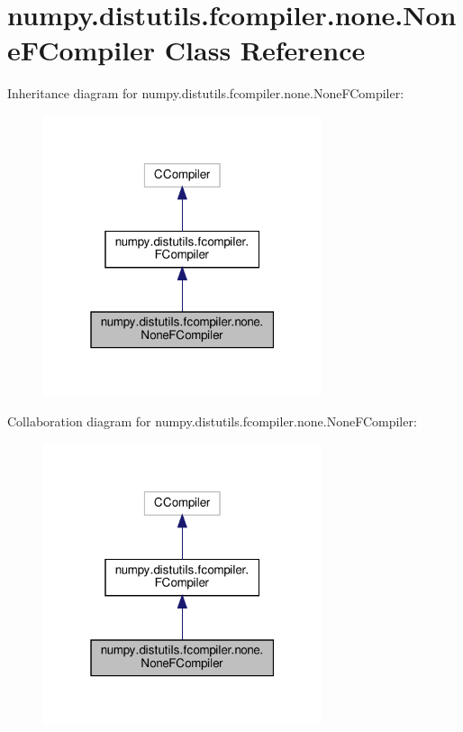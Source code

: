 \hypertarget{classnumpy_1_1distutils_1_1fcompiler_1_1none_1_1NoneFCompiler}{}\section{numpy.\+distutils.\+fcompiler.\+none.\+None\+F\+Compiler Class Reference}
\label{classnumpy_1_1distutils_1_1fcompiler_1_1none_1_1NoneFCompiler}


Inheritance diagram for numpy.\+distutils.\+fcompiler.\+none.\+None\+F\+Compiler\+:
\nopagebreak
\begin{figure}[H]
\begin{center}
\leavevmode
\includegraphics[width=232pt]{classnumpy_1_1distutils_1_1fcompiler_1_1none_1_1NoneFCompiler__inherit__graph}
\end{center}
\end{figure}


Collaboration diagram for numpy.\+distutils.\+fcompiler.\+none.\+None\+F\+Compiler\+:
\nopagebreak
\begin{figure}[H]
\begin{center}
\leavevmode
\includegraphics[width=232pt]{classnumpy_1_1distutils_1_1fcompiler_1_1none_1_1NoneFCompiler__coll__graph}
\end{center}
\end{figure}
